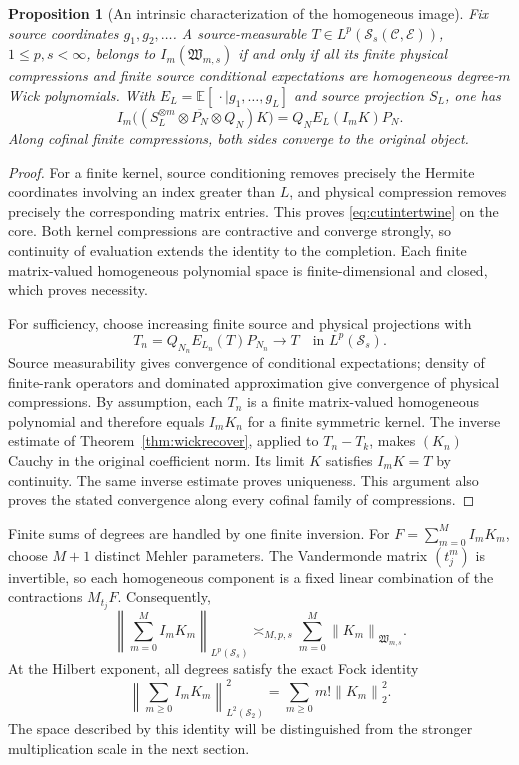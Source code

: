 \documentclass[11pt,a4paper]{amsart}
\numberwithin{equation}{section}
\newtheorem{proposition}[theorem]{Proposition}
\theoremstyle{definition}
\theoremstyle{remark}
\newcommand{\E}{\mathbb E}
\newcommand{\cC}{\mathcal C}
\newcommand{\cE}{\mathcal E}
\newcommand{\Sch}{\mathcal S}
\newcommand{\Wc}{\mathfrak W}
\newcommand{\norm}[1]{\left\lVert#1\right\rVert}
\begin{document}
\begin{proposition}[An intrinsic characterization of the homogeneous image]\label{prop:chaosimage}
Fix source coordinates $g_1,g_2,\ldots$. A source-measurable $T\in L^p(\Sch_s(\cC,\cE))$, $1\le p,s<\infty$, belongs to $I_m(\Wc_{m,s})$ if and only if all its finite physical compressions and finite source conditional expectations are homogeneous degree-$m$ Wick polynomials. With $E_L=\E[\,\cdot\mid g_1,\ldots,g_L]$ and source projection $S_L$, one has
\begin{equation}\label{eq:cutintertwine}
 I_m\big((S_L^{\otimes m}\otimes\overline{P_N}\otimes Q_N)K\big)
 =Q_NE_L(I_mK)P_N.
\end{equation}
Along cofinal finite compressions, both sides converge to the original object.
\end{proposition}
\begin{proof}
For a finite kernel, source conditioning removes precisely the Hermite coordinates involving an index greater than $L$, and physical compression removes precisely the corresponding matrix entries. This proves \eqref{eq:cutintertwine} on the core. Both kernel compressions are contractive and converge strongly, so continuity of evaluation extends the identity to the completion. Each finite matrix-valued homogeneous polynomial space is finite-dimensional and closed, which proves necessity.

For sufficiency, choose increasing finite source and physical projections with
\[
 T_n=Q_{N_n}E_{L_n}(T)P_{N_n}\longrightarrow T\quad\text{in }L^p(\Sch_s).
\] Source measurability gives convergence of conditional expectations; density of finite-rank operators and dominated approximation give convergence of physical compressions. By assumption, each $T_n$ is a finite matrix-valued homogeneous polynomial and therefore equals $I_mK_n$ for a finite symmetric kernel. The inverse estimate of Theorem~\ref{thm:wickrecover}, applied to $T_n-T_k$, makes $(K_n)$ Cauchy in the original coefficient norm. Its limit $K$ satisfies $I_mK=T$ by continuity. The same inverse estimate proves uniqueness. This argument also proves the stated convergence along every cofinal family of compressions.
\end{proof}

Finite sums of degrees are handled by one finite inversion. For $F=\sum_{m=0}^MI_mK_m$, choose $M+1$ distinct Mehler parameters. The Vandermonde matrix $(t_j^m)$ is invertible, so each homogeneous component is a fixed linear combination of the contractions $M_{t_j}F$. Consequently,
\begin{equation}\label{eq:finitechaos}
 \norm{\sum_{m=0}^MI_mK_m}_{L^p(\Sch_s)}
 \asymp_{M,p,s}\sum_{m=0}^M\norm{K_m}_{\Wc_{m,s}}.
\end{equation}
At the Hilbert exponent, all degrees satisfy the exact Fock identity
\begin{equation}\label{eq:hilbertfock}
 \norm{\sum_{m\ge0}I_mK_m}_{L^2(\Sch_2)}^2
 =\sum_{m\ge0}m!\norm{K_m}_2^2.
\end{equation}
The space described by this identity will be distinguished from the stronger multiplication scale in the next section.
\end{document}
